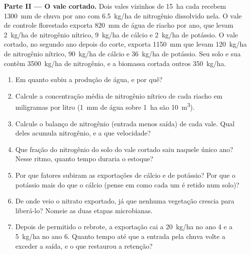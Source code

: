 \begin{problem}
\medskip
\noindent\textbf{Parte II --- O vale cortado.}
Dois vales vizinhos de \qty{15}{ha} cada recebem \qty{1300}{mm} de
chuva por ano com \qty{6.5}{kg/ha} de nitrogênio dissolvido nela. O
vale de controle florestado exporta \qty{820}{mm} de água de riacho
por ano, que levam \qty{2}{kg/ha} de nitrogênio nítrico,
\qty{9}{kg/ha} de cálcio e \qty{2}{kg/ha} de potássio. O vale cortado,
no segundo ano depois do corte, exporta \qty{1150}{mm} que levam
\qty{120}{kg/ha} de nitrogênio nítrico, \qty{90}{kg/ha} de cálcio e
\qty{36}{kg/ha} de potássio. Seu solo e sua  contêm
\qty{3500}{kg/ha} de nitrogênio, e a biomassa cortada outros
\qty{350}{kg/ha}.
\begin{enumerate}[resume]
  \item Em quanto subiu a produção de água, e por quê?
  \item Calcule a concentração média de nitrogênio nítrico de cada
        riacho em miligramas por litro (\qty{1}{mm} de água sobre
        \qty{1}{ha} são \qty{10}{m^3}).
  \item Calcule o balanço de nitrogênio (entrada menos saída) de cada
        vale. Qual deles acumula nitrogênio, e a que velocidade?
  \item Que fração do nitrogênio do solo do vale cortado saiu naquele
        único ano? Nesse ritmo, quanto tempo duraria o estoque?
  \item Por que fatores subiram as exportações de cálcio e de
        potássio? Por que o potássio mais do que o cálcio (pense em
        como cada um é retido num solo)?
  \item De onde veio o nitrato exportado, já que nenhuma vegetação
        crescia para liberá-lo? Nomeie as duas etapas microbianas.
  \item Depois de permitido o rebrote, a exportação cai a
        \qty{20}{kg/ha} no ano 4 e a \qty{5}{kg/ha} no ano 6. Quanto
        tempo até que a entrada pela chuva volte a exceder a saída, e o
        que restaurou a retenção?
\end{enumerate}


\end{problem}
